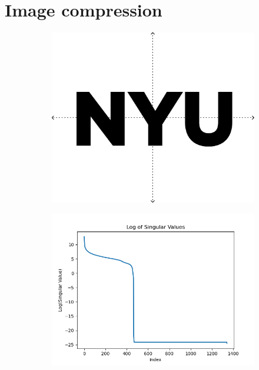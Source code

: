 \documentclass{article}%
\begin{document}
\section{Image compression}
\begin{figure}[H]
\centering
\begin{subfigure}{0.3\textwidth}
\includegraphics[width=\linewidth]{./code/NYU.png}
\end{subfigure}
\begin{subfigure}{0.3\textwidth}
\includegraphics[width=\linewidth]{./code/singular_values_plot.png}
\end{subfigure}
\end{figure}
\end{document}
